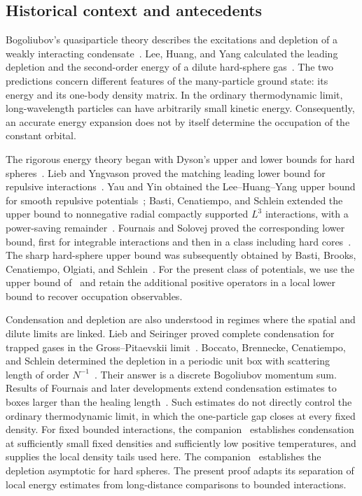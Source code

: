 \subsection{Historical context and antecedents}

Bogoliubov's quasiparticle theory describes the excitations and depletion
of a weakly interacting condensate~\cite{Bogoliubov}. Lee, Huang, and
Yang calculated the leading depletion and the second-order energy of
a dilute hard-sphere gas~\cite{LHY}. The two predictions concern
different features of the many-particle ground state: its energy and
its one-body density matrix. In the ordinary thermodynamic limit,
long-wavelength particles can have arbitrarily small kinetic energy.
Consequently, an accurate energy expansion does not by itself determine
the occupation of the constant orbital.

The rigorous energy theory began with Dyson's upper and lower bounds
for hard spheres~\cite{Dyson}. Lieb and Yngvason proved the matching
leading lower bound for repulsive interactions~\cite{LiebYngvason}.
Yau and Yin obtained the Lee--Huang--Yang upper bound for smooth
repulsive potentials~\cite{YauYin}; Basti, Cenatiempo, and Schlein
extended the upper bound to nonnegative radial compactly supported
$L^3$ interactions, with a power-saving remainder~\cite{BCSUpper}.
Fournais and Solovej proved the corresponding lower bound, first for
integrable interactions and then in a class including hard
cores~\cite{FS2020,FS2023}. The sharp hard-sphere upper bound was
subsequently obtained by Basti, Brooks, Cenatiempo, Olgiati, and
Schlein~\cite{BBCOS}. For the present class of potentials, we use the
upper bound of~\cite[Theorem~1.1]{BCSUpper} and retain the additional
positive operators in a local lower bound to recover occupation
observables.

Condensation and depletion are also understood in regimes where the
spatial and dilute limits are linked. Lieb and Seiringer proved complete
condensation for trapped gases in the Gross--Pitaevskii
limit~\cite{LS2002}. Boccato, Brennecke, Cenatiempo, and Schlein
determined the depletion in a periodic unit box with scattering length
of order $N^{-1}$~\cite[Appendix~A]{BBCS}. Their answer is a discrete
Bogoliubov momentum sum. Results of Fournais and later developments
extend condensation estimates to boxes larger than the healing
length~\cite{Fournais2021,Junge2026}. Such estimates do not directly
control the ordinary thermodynamic limit, in which the one-particle
gap closes at every fixed density. For fixed bounded interactions,
the companion~\cite{C} establishes condensation at sufficiently small
fixed densities and sufficiently low positive temperatures, and supplies
the local density tails used here.
The companion~\cite{D} establishes the depletion asymptotic for hard
spheres. The present proof adapts its separation of local energy
estimates from long-distance comparisons to bounded interactions.


